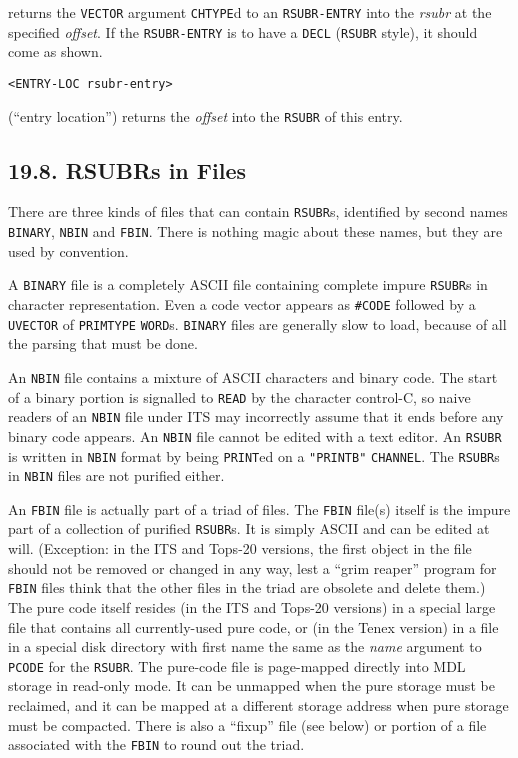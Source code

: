 \documentclass[a4paper,]{article}
\begin{document}
 returns the \texttt{VECTOR} argument \texttt{CHTYPE}d to an \texttt{RSUBR-ENTRY} into
the \emph{rsubr} at the specified \emph{offset}. If the \texttt{RSUBR-ENTRY} is to have a \texttt{DECL} (\texttt{RSUBR}
style), it should come as shown.

\begin{verbatim}
<ENTRY-LOC rsubr-entry>
\end{verbatim}

 (``entry location'') returns the \emph{offset} into the \texttt{RSUBR} of this entry.

\subsection{19.8. RSUBRs in Files}\label{rsubrs-in-files}

There are three kinds of files that can contain \texttt{RSUBR}s, identified by second names
\texttt{BINARY}, \texttt{NBIN} and
\texttt{FBIN}. There is nothing magic about these names, but they are used by convention.

A \texttt{BINARY} file is a completely ASCII file containing complete impure \texttt{RSUBR}s in character representation.
Even a code vector appears as \texttt{\#CODE} followed by a \texttt{UVECTOR} of \texttt{PRIMTYPE} \texttt{WORD}s.
\texttt{BINARY} files are generally slow to load, because of all the parsing that must be done.

An \texttt{NBIN} file contains a mixture of ASCII characters and binary code. The start of a binary portion is signalled to
\texttt{READ} by the character control-C, so naive readers of an \texttt{NBIN} file under ITS may
incorrectly assume that it ends before any binary code appears. An \texttt{NBIN} file cannot be edited with a text editor.
An \texttt{RSUBR} is written in \texttt{NBIN} format by being \texttt{PRINT}ed on a \texttt{"PRINTB"} \texttt{CHANNEL}. The
\texttt{RSUBR}s in \texttt{NBIN} files are not purified either.

An \texttt{FBIN} file is actually part of a triad of files. The \texttt{FBIN} file(s) itself is the impure part of a
collection of purified \texttt{RSUBR}s. It is simply ASCII and can be edited at will. (Exception: in the ITS and
Tops-20 versions, the first object in the file should not be removed or changed in any way, lest a
``grim reaper'' program for \texttt{FBIN} files think that the other files in the triad are obsolete and delete them.) The
pure code itself resides (in the ITS and Tops-20 versions) in a special large file that contains all currently-used pure
code, or (in the Tenex version) in a file in a special disk directory with first name the same as the
\emph{name} argument to \texttt{PCODE} for the \texttt{RSUBR}. The pure-code file is page-mapped directly into MDL storage
in read-only mode. It can be unmapped when the pure storage must be reclaimed, and it can be mapped at a different storage
address when pure storage must be compacted. There is also a ``fixup'' file (see below) or portion of a file associated
with the \texttt{FBIN} to round out the triad.
\end{document}

